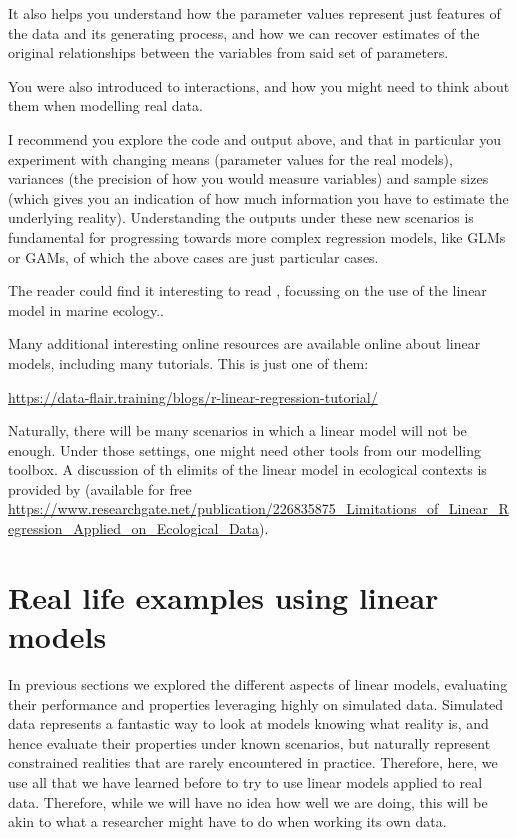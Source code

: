\documentclass[
]{book}
\begin{document}
It also helps you understand how the parameter values represent just features of the data and its generating process, and how we can recover estimates of the original relationships between the variables from said set of parameters.

You were also introduced to interactions, and how you might need to think about them when modelling real data.

I recommend you explore the code and output above, and that in particular you experiment with changing means (parameter values for the real models), variances (the precision of how you would measure variables) and sample sizes (which gives you an indication of how much information you have to estimate the underlying reality). Understanding the outputs under these new scenarios is fundamental for progressing towards more complex regression models, like GLMs or GAMs, of which the above cases are just particular cases.

The reader could find it interesting to read \citet{Boldina2016}, focussing on the use of the linear model in marine ecology..

Many additional interesting online resources are available online about linear models, including many tutorials. This is just one of them:

\url{https://data-flair.training/blogs/r-linear-regression-tutorial/}

Naturally, there will be many scenarios in which a linear model will not be enough. Under those settings, one might need other tools from our modelling toolbox. A discussion of th elimits of the linear model in ecological contexts is provided by \citet{Zuur2009c} (available for free \href{here}{https://www.researchgate.net/publication/226835875\_Limitations\_of\_Linear\_Regression\_Applied\_on\_Ecological\_Data}).

\hypertarget{LMinPractice}{%
\chapter{Real life examples using linear models}\label{LMinPractice}}

In previous sections we explored the different aspects of linear models, evaluating their performance and properties leveraging highly on simulated data. Simulated data represents a fantastic way to look at models knowing what reality is, and hence evaluate their properties under known scenarios, but naturally represent constrained realities that are rarely encountered in practice. Therefore, here, we use all that we have learned before to try to use linear models applied to real data. Therefore, while we will have no idea how well we are doing, this will be akin to what a researcher might have to do when working its own data.
\end{document}
